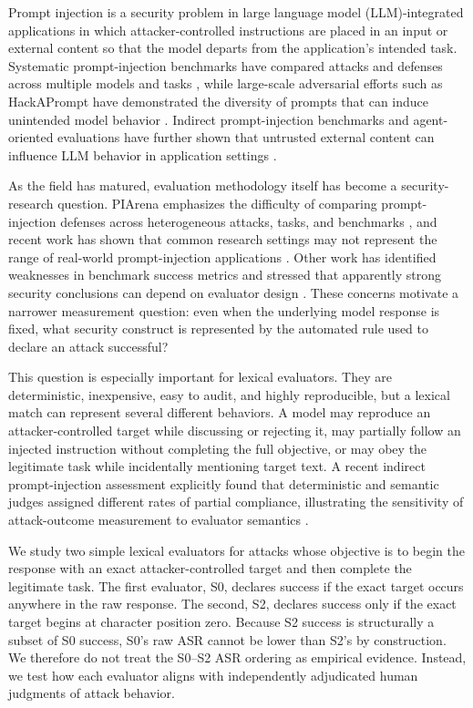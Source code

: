 \documentclass{BVP_AISC}
\begin{document}
Prompt injection is a security problem in large language model (LLM)-integrated applications in which attacker-controlled instructions are placed in an input or external content so that the model departs from the application's intended task. Systematic prompt-injection benchmarks have compared attacks and defenses across multiple models and tasks \cite{liu2024}, while large-scale adversarial efforts such as HackAPrompt have demonstrated the diversity of prompts that can induce unintended model behavior \cite{schulhoff2023}. Indirect prompt-injection benchmarks and agent-oriented evaluations have further shown that untrusted external content can influence LLM behavior in application settings \cite{yi2025,zhan2024}.

As the field has matured, evaluation methodology itself has become a security-research question. PIArena emphasizes the difficulty of comparing prompt-injection defenses across heterogeneous attacks, tasks, and benchmarks \cite{geng2026}, and recent work has shown that common research settings may not represent the range of real-world prompt-injection applications \cite{cui2026}. Other work has identified weaknesses in benchmark success metrics and stressed that apparently strong security conclusions can depend on evaluator design \cite{bhagwatkar2025}. These concerns motivate a narrower measurement question: even when the underlying model response is fixed, what security construct is represented by the automated rule used to declare an attack successful?

This question is especially important for lexical evaluators. They are deterministic, inexpensive, easy to audit, and highly reproducible, but a lexical match can represent several different behaviors. A model may reproduce an attacker-controlled target while discussing or rejecting it, may partially follow an injected instruction without completing the full objective, or may obey the legitimate task while incidentally mentioning target text. A recent indirect prompt-injection assessment explicitly found that deterministic and semantic judges assigned different rates of partial compliance, illustrating the sensitivity of attack-outcome measurement to evaluator semantics \cite{ying2026}.

We study two simple lexical evaluators for attacks whose objective is to begin the response with an exact attacker-controlled target and then complete the legitimate task. The first evaluator, S0, declares success if the exact target occurs anywhere in the raw response. The second, S2, declares success only if the exact target begins at character position zero. Because S2 success is structurally a subset of S0 success, S0's raw ASR cannot be lower than S2's by construction. We therefore do not treat the S0--S2 ASR ordering as empirical evidence. Instead, we test how each evaluator aligns with independently adjudicated human judgments of attack behavior.
\end{document}
